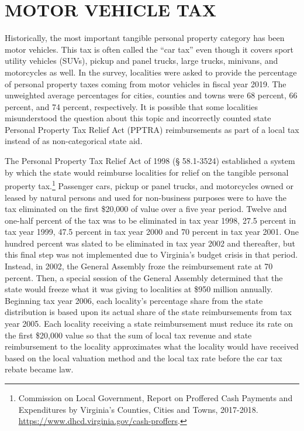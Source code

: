 \documentclass[
]{book}
\begin{document}
\hypertarget{motor-vehicle-tax}{%
\section{MOTOR VEHICLE TAX}\label{motor-vehicle-tax}}

Historically, the most important tangible personal property category has been motor vehicles. This tax is often called the ``car tax'' even though it covers sport utility vehicles (SUVs), pickup and panel trucks, large trucks, minivans, and motorcycles as well. In the survey, localities were asked to provide the percentage of personal property taxes coming from motor vehicles in fiscal year 2019. The unweighted average percentages for cities, counties and towns were 68 percent, 66 percent, and 74 percent, respectively. It is possible that some localities misunderstood the question about this topic and incorrectly counted state Personal Property Tax Relief Act (PPTRA) reimbursements as part of a local tax instead of as non-categorical state aid.

The Personal Property Tax Relief Act of 1998 (§ 58.1-3524) established a system by which the state would reimburse localities for relief on the tangible personal property tax.\footnote{Commission on Local Government, Report on Proffered Cash Payments and Expenditures by Virginia's Counties, Cities and Towns, 2017-2018. \url{https://www.dhcd.virginia.gov/cash-proffers}.} Passenger cars, pickup or panel trucks, and motorcycles owned or leased by natural persons and used for non-business purposes were to have the tax eliminated on the first \$20,000 of value over a five year period. Twelve and one-half percent of the tax was to be eliminated in tax year 1998, 27.5 percent in tax year 1999, 47.5 percent in tax year 2000 and 70 percent in tax year 2001. One hundred percent was slated to be eliminated in tax year 2002 and thereafter, but this final step was not implemented due to Virginia's budget crisis in that period. Instead, in 2002, the General Assembly froze the reimbursement rate at 70 percent. Then, a special session of the General Assembly determined that the state would freeze what it was giving to localities at \$950 million annually. Beginning tax year 2006, each locality's percentage share from the state distribution is based upon its actual share of the state reimbursements from tax year 2005. Each locality receiving a state reimbursement must reduce its rate on the first \$20,000 value so that the sum of local tax revenue and state reimbursement to the locality approximates what the locality would have received based on the local valuation method and the local tax rate before the car tax rebate became law.
\end{document}

